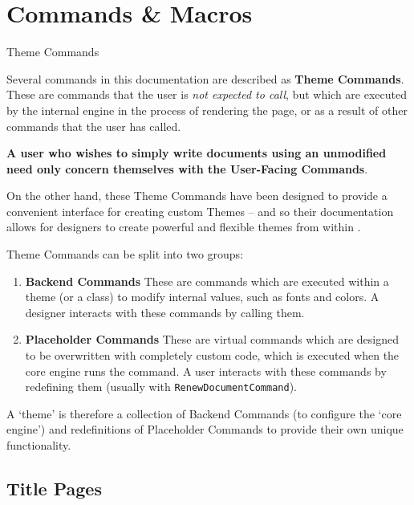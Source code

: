 


\chapter{Commands \& Macros}
	\def\backendCommand{\hyperref[S:ThemeCommands]{\textcolor{blue!40!black}{{Backend Command}}}}
		\def\placeholderCommand{\hyperref[S:ThemeCommands]{\textcolor{blue!40!black}{{Placeholder Command}}}}
	\begin{RpgSidebar}{Theme Commands}\label{S:ThemeCommands}

		Several commands in this documentation are described as \textbf{Theme Commands}. These are commands that the user is \textit{not expected to call}, but which are executed by the internal engine in the process of rendering the page, or as a result of other commands that the user has called. 

		\begin{center}
		\large \textbf{A user who wishes to simply write documents using an unmodified \rpgtex{} need only concern themselves with the User-Facing Commands}. 
		\end{center}
		On the other hand, these Theme Commands have been designed to provide a convenient interface for creating custom Themes -- and so their documentation allows for designers to create powerful and flexible themes from within \rpgtex{}. 
		
		Theme Commands can be split into two groups:
		
		\begin{enumerate}
			\item \textbf{Backend Commands} These are commands which are executed within a theme (or a class) to modify internal values, such as fonts and colors. A designer interacts with these commands by calling them.
			\item \textbf{Placeholder Commands} These are virtual commands which are designed to be overwritten with completely custom code, which is executed when the core engine runs the command. A user interacts with these commands by redefining them  (usually with \verb|RenewDocumentCommand|).
		\end{enumerate}

		A `theme' is therefore a collection of Backend Commands (to configure the `core engine') and redefinitions of Placeholder Commands to provide their own unique functionality.
		
	\end{RpgSidebar}
	\section{Title Pages}
